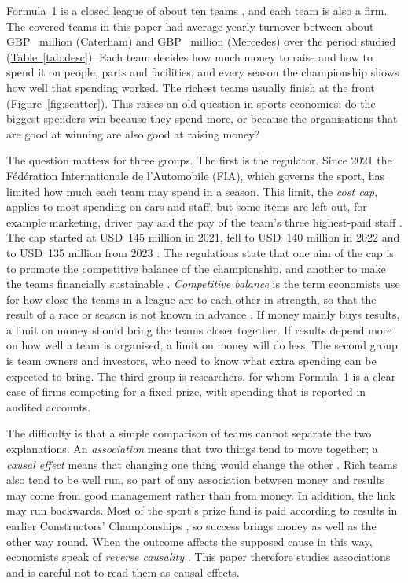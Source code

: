 \documentclass[11pt,a4paper]{article}
\begin{document}
Formula~1 is a closed league of about ten teams \citep{liberty2026}, and each team is also a firm. The covered teams in this
paper had average yearly turnover between about GBP~\TurnAvgCaterham{} million (Caterham) and GBP~\TurnAvgMercedes{} million
(Mercedes) over the period studied (\hyperref[tab:desc]{Table~\ref*{tab:desc}}). Each team decides how much money to raise
and how to spend it on people, parts and facilities, and every season the championship shows how well that spending worked.
The richest teams usually finish at the front (\hyperref[fig:scatter]{Figure~\ref*{fig:scatter}}). This raises an old
question in sports economics: do the biggest spenders win because they spend more, or because the organisations that are
good at winning are also good at raising money?

The question matters for three groups. The first is the regulator. Since 2021 the
F\'ed\'eration Internationale de l'Automobile (FIA), which governs the sport, has limited how much each team may spend in a
season. This limit, the \textit{cost cap}, applies to most spending on cars and staff, but some items are left out, for
example marketing, driver pay and the pay of the team's three highest-paid staff \citep[Articles 2.3 and 3.1]{fia2021}. The
cap started at USD~145 million in 2021, fell to USD~140 million in 2022 and to USD~135 million from 2023
\citep[Article 2.3]{fia2021}. The regulations state that one aim of the cap is to promote the competitive balance of the championship, and another to
make the teams financially sustainable \citep[Article 1.3]{fia2021}. \textit{Competitive balance} is the term economists use for how close the teams in a league are to each other in strength, so that the result of a race or
season is not known in advance \citep{szymanski2003}. If money mainly buys results, a limit on money should bring the teams
closer together. If results depend more on how well a team is organised, a limit on money will do less. The second group is
team owners and investors, who need to know what extra spending can be expected to bring. The third group is researchers,
for whom Formula~1 is a clear case of firms competing for a fixed prize, with spending that is reported in audited accounts.

The difficulty is that a simple comparison of teams cannot separate the two explanations.
An \textit{association} means that two things tend to move together; a \textit{causal effect} means that changing one thing
would change the other \citep{angrist2009}. Rich teams also tend to be well run, so part of any association
between money and results may come from good management rather than from money. In addition, the link may run backwards.
Most of the sport's prize fund is paid according to results in earlier Constructors' Championships \citep{liberty2018}, so
success brings money as well as the other way round. When the outcome affects the supposed cause in this way, economists
speak of \textit{reverse causality} \citep[Chapter~16]{wooldridge2020}. This paper therefore studies associations and is careful
not to read them as causal effects.
\end{document}
